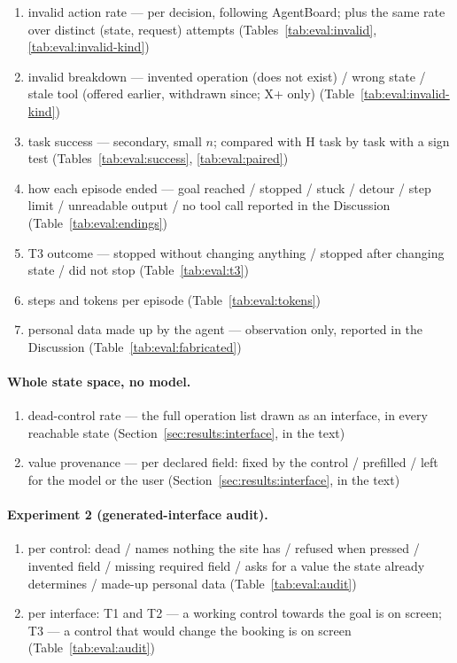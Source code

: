 \begin{enumerate}
    \item invalid action rate --- per decision, following AgentBoard; plus the same rate over distinct (state, request) attempts (Tables~\ref{tab:eval:invalid}, \ref{tab:eval:invalid-kind})
    \item invalid breakdown --- invented operation (does not exist) / wrong state / stale tool (offered earlier, withdrawn since; X+ only) (Table~\ref{tab:eval:invalid-kind})
    \item task success --- secondary, small $n$; compared with H task by task with a sign test (Tables~\ref{tab:eval:success}, \ref{tab:eval:paired})
    \item how each episode ended --- goal reached / stopped / stuck / detour / step limit / unreadable output / no tool call reported in the Discussion (Table~\ref{tab:eval:endings})
    \item T3 outcome --- stopped without changing anything / stopped after changing state / did not stop (Table~\ref{tab:eval:t3})
    \item steps and tokens per episode (Table~\ref{tab:eval:tokens})
    \item personal data made up by the agent --- observation only, reported in the Discussion (Table~\ref{tab:eval:fabricated})
\end{enumerate}

\paragraph{Whole state space, no model.}

\begin{enumerate}
    \item dead-control rate --- the full operation list drawn as an interface, in every reachable state (Section~\ref{sec:results:interface}, in the text)
    \item value provenance --- per declared field: fixed by the control / prefilled / left for the model or the user (Section~\ref{sec:results:interface}, in the text)
\end{enumerate}

\paragraph{Experiment 2 (generated-interface audit).}

\begin{enumerate}
    \item per control: dead / names nothing the site has / refused when pressed / invented field / missing required field / asks for a value the state already determines / made-up personal data (Table~\ref{tab:eval:audit})
    \item per interface: T1 and T2 --- a working control towards the goal is on screen; T3 --- a control that would change the booking is on screen (Table~\ref{tab:eval:audit})
\end{enumerate}


